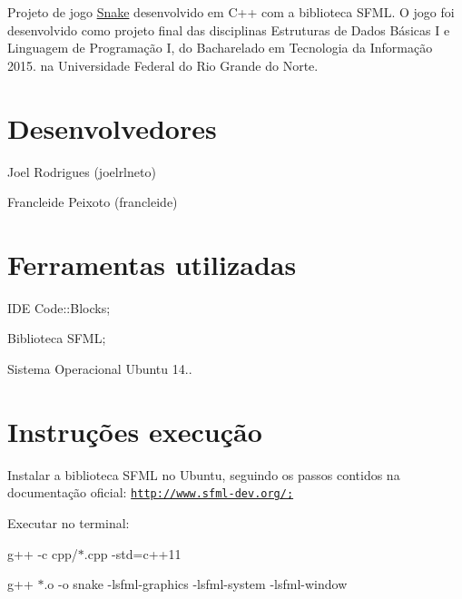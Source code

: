 Projeto de jogo \hyperlink{class_snake}{Snake} desenvolvido em C++ com a biblioteca S\+F\+M\+L. O jogo foi desenvolvido como projeto final das disciplinas Estruturas de Dados Básicas I e Linguagem de Programação I, do Bacharelado em Tecnologia da Informação 2015. na Universidade Federal do Rio Grande do Norte.

\section*{Desenvolvedores}


\begin{DoxyItemize}
\item Joel Rodrigues (joelrlneto)
\item Francleide Peixoto (francleide)
\end{DoxyItemize}

\section*{Ferramentas utilizadas}


\begin{DoxyItemize}
\item I\+D\+E Code\+::\+Blocks;
\item Biblioteca S\+F\+M\+L;
\item Sistema Operacional Ubuntu 14..
\end{DoxyItemize}

\section*{Instruções execução}


\begin{DoxyItemize}
\item Instalar a biblioteca S\+F\+M\+L no Ubuntu, seguindo os passos contidos na documentação oficial\+: \href{http://www.sfml-dev.org/;}{\tt http\+://www.\+sfml-\/dev.\+org/;}
\item Executar no terminal\+:
\end{DoxyItemize}

{\ttfamily g++ -\/c cpp/$\ast$.cpp -\/std=c++11}

{\ttfamily g++ $\ast$.o -\/o snake -\/lsfml-\/graphics -\/lsfml-\/system -\/lsfml-\/window} 